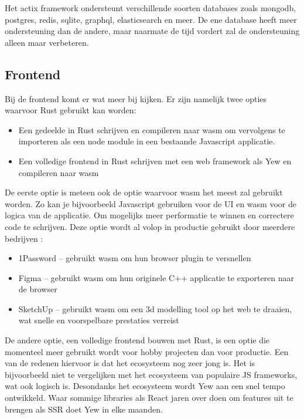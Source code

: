 Het actix framework ondersteunt verschillende soorten databases zoals mongodb, postgres, redis,
sqlite, graphql, elasticsearch en meer. De ene database heeft meer ondersteuning dan de andere, maar
naarmate de tijd vordert zal de ondersteuning alleen maar verbeteren. 

\subsection{Frontend}

Bij de frontend komt er wat meer bij kijken. Er zijn namelijk twee opties waarvoor Rust gebruikt kan
worden: 
\begin{itemize}
  \item Een gedeelde in Rust schrijven en compileren naar wasm om vervolgens te importeren als een node
    module in een bestaande Javascript applicatie. 
  \item Een volledige frontend in Rust schrijven met een web framework als Yew en compileren naar wasm 
\end{itemize}               

\clearpage

De eerste optie is meteen ook de optie waarvoor wasm het meest zal gebruikt worden. Zo kan je
bijvoorbeeld Javascript gebruiken voor de UI en wasm voor de logica van de applicatie. Om mogelijks
meer performatie te winnen en correctere code te schrijven. Deze optie wordt al volop in productie
gebruikt door meerdere bedrijven \cite{made_with_wasm}: 
\begin{itemize}
  \item 1Password – gebruikt wasm om hun browser plugin te versnellen 
  \item Figma – gebruikt wasm om hun originele C++ applicatie te exporteren naar de browser 
  \item SketchUp – gebruikt wasm om een 3d modelling tool op het web te draaien, wat snelle en
    voorspelbare prestaties verreist 
\end{itemize}

De andere optie, een volledige frontend bouwen met Rust, is een optie die momenteel meer gebruikt
wordt voor hobby projecten dan voor productie. Een van de redenen hiervoor is dat het ecosysteem nog
zeer jong is. Het is bijvoorbeeld niet te vergelijken met het ecosysteem van populaire JS
frameworks, wat ook logisch is. Desondanks het ecosysteem wordt Yew aan een snel tempo ontwikkeld.
Waar sommige libraries als React jaren over doen om features uit te brengen als SSR doet Yew in elke
maanden.

